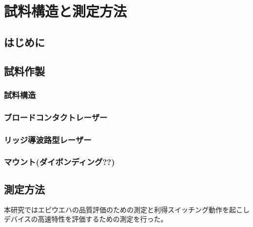 
\chapter{試料構造と測定方法}

\section{はじめに}

\section{試料作製}
\subsection{試料構造}
\subsection{ブロードコンタクトレーザー}
\subsection{リッジ導波路型レーザー}
\subsection{マウント(ダイボンディング??)}
\section{測定方法}
本研究ではエピウエハの品質評価のための測定と利得スイッチング動作を起こしデバイスの高速特性を評価するための測定を行った。
